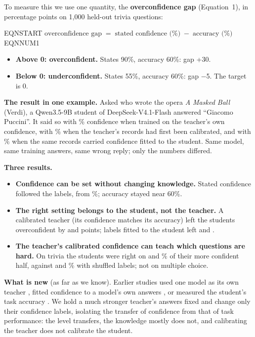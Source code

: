 \documentclass[10pt]{article}
\begin{document}
To measure this we use one quantity, the \textbf{overconfidence gap} (Equation~1), in percentage points on 1{,}000 held-out trivia questions:

EQNSTART $\displaystyle \text{overconfidence gap} \;=\; \text{stated confidence (\%)} \;-\; \text{accuracy (\%)}$ EQNNUM1

\begin{itemize}
\item \textbf{Above 0: overconfident.} States 90\%, accuracy 60\%: gap +30.
\item \textbf{Below 0: underconfident.} States 55\%, accuracy 60\%: gap $-$5. The target is 0.
\end{itemize}

\textbf{The result in one example.} Asked who wrote the opera \emph{A Masked Ball} (Verdi), a Qwen3.5-9B student of DeepSeek-V4.1-Flash answered ``Giacomo Puccini''. It said so with \dExRaw{}\% confidence when trained on the teacher's own confidence, with \dExTcal{}\% when the teacher's records had first been calibrated, and with \dExScal{}\% when the same records carried confidence fitted to the student. Same model, same training answers, same wrong reply; only the numbers differed.


\textbf{Three results.}
\begin{itemize}
\item \textbf{Confidence can be set without changing knowledge.} Stated confidence followed the labels, from \dQGreedyConfRange{}\%; accuracy stayed near 60\%.
\item \textbf{The right setting belongs to the student, not the teacher.} A calibrated teacher (its confidence matches its accuracy) left the students overconfident by \dQTcalGap{} and \dGTcalGap{} points; labels fitted to the student left \dQScalGap{} and \dGScalGap{}.
\item \textbf{The teacher's calibrated confidence can teach which questions are hard.} On trivia the students were right on \dQSelTcal{} and \dGSelTcal{}\% of their more confident half, against \dQSelShuf{} and \dGSelShuf{}\% with shuffled labels; not on multiple choice.
\end{itemize}
\textbf{What is new} (as far as we know). Earlier studies used one model as its own teacher \cite{sumit,roe}, fitted confidence to a model's own answers \cite{lin}, or measured the student's task accuracy \cite{kdcal,zhan}. We hold a much stronger teacher's answers fixed and change only their confidence labels, isolating the transfer of confidence from that of task performance: the level transfers, the knowledge mostly does not, and calibrating the teacher does not calibrate the student.
\end{document}

